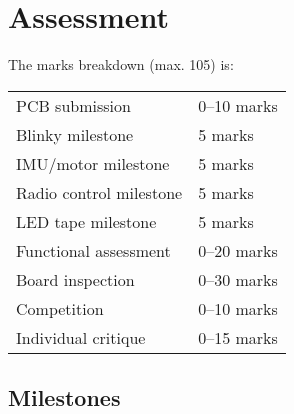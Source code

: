 \documentclass[11pt, a4paper]{article}
\begin{document}
\section{Assessment}

The marks breakdown (max. 105) is:
%
\begin{flushleft}
  \begin{tabular}{ll}
    PCB submission & 0--10 marks\\
    Blinky milestone  & 5 marks\\    
    IMU/motor milestone  & 5 marks\\
    Radio control milestone  & 5 marks\\
    LED tape milestone  & 5 marks\\    
    Functional assessment & 0--20 marks \\
    Board inspection & 0--30 marks \\
    Competition & 0--10 marks \\
    Individual critique & 0--15 marks \\
  \end{tabular}
  
\end{flushleft}

\subsection{Milestones}
\end{document}
